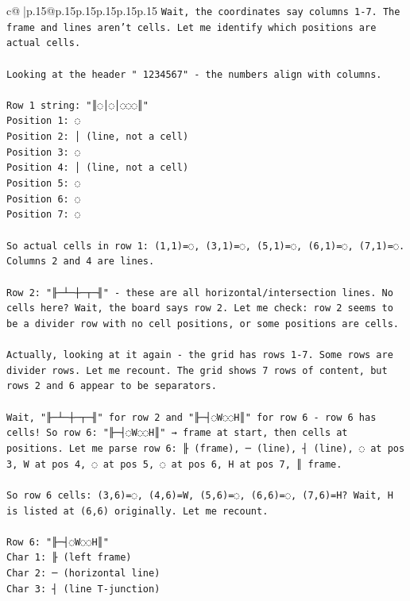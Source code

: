 \documentclass{article}
\begin{document}
{\begin{supertabular}{c@{$\;$}|p{.15\linewidth}@{}p{.15\linewidth}p{.15\linewidth}p{.15\linewidth}p{.15\linewidth}p{.15\linewidth}}
{{{\texttt{Wait, the coordinates say columns 1{-}7. The frame and lines aren't cells. Let me identify which positions are actual cells.} \\
\\ 
\texttt{Looking at the header " 1234567" {-} the numbers align with columns.} \\
\\ 
\texttt{Row 1 string: "║◌│◌│◌◌◌║"} \\
\texttt{Position 1: ◌} \\
\texttt{Position 2: │ (line, not a cell)} \\
\texttt{Position 3: ◌} \\
\texttt{Position 4: │ (line, not a cell)} \\
\texttt{Position 5: ◌} \\
\texttt{Position 6: ◌} \\
\texttt{Position 7: ◌} \\
\\ 
\texttt{So actual cells in row 1: (1,1)=◌, (3,1)=◌, (5,1)=◌, (6,1)=◌, (7,1)=◌. Columns 2 and 4 are lines.} \\
\\ 
\texttt{Row 2: "╟─┴─┼─┬─╢" {-} these are all horizontal/intersection lines. No cells here? Wait, the board says row 2. Let me check: row 2 seems to be a divider row with no cell positions, or some positions are cells.} \\
\\ 
\texttt{Actually, looking at it again {-} the grid has rows 1{-}7. Some rows are divider rows. Let me recount. The grid shows 7 rows of content, but rows 2 and 6 appear to be separators.} \\
\\ 
\texttt{Wait, "╟─┴─┼─┬─╢" for row 2 and "╟─┤◌W◌◌H║" for row 6 {-} row 6 has cells! So row 6: "╟─┤◌W◌◌H║" → frame at start, then cells at positions. Let me parse row 6: ╟ (frame), ─ (line), ┤ (line), ◌ at pos 3, W at pos 4, ◌ at pos 5, ◌ at pos 6, H at pos 7, ║ frame.} \\
\\ 
\texttt{So row 6 cells: (3,6)=◌, (4,6)=W, (5,6)=◌, (6,6)=◌, (7,6)=H? Wait, H is listed at (6,6) originally. Let me recount.} \\
\\ 
\texttt{Row 6: "╟─┤◌W◌◌H║"} \\
\texttt{Char 1: ╟ (left frame)} \\
\texttt{Char 2: ─ (horizontal line)} \\
\texttt{Char 3: ┤ (line T{-}junction)} \\
}}}
\end{supertabular}}
\end{document}
